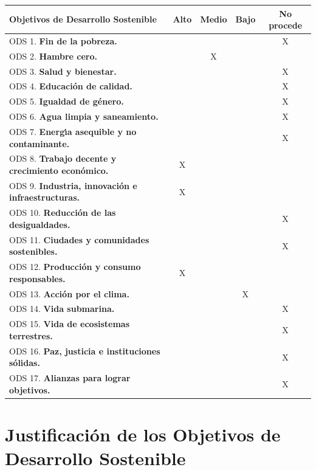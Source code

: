 \documentclass[11pt,spanish,listoffigures,listoftables]{tfgetsinf}
\begin{document}
\begin{tabularx}{\textwidth}{|>{\raggedright\arraybackslash}X|c|c|c|c|}\hline
   \textbf{Objetivos de Desarrollo Sostenible} & \textbf{Alto} & \textbf{Medio} & \textbf{Bajo} & \textbf{No procede} \\ \hline
   ODS 1.  \textbf{Fin de la pobreza.}                            & & & & X \\ \hline
   ODS 2.  \textbf{Hambre cero.}                                  & & X & & \\ \hline
   ODS 3.  \textbf{Salud y bienestar.}                            & & & & X\\ \hline
   ODS 4.  \textbf{Educaci\'on de calidad.}                       & & & & X \\ \hline
   ODS 5.  \textbf{Igualdad de g\'enero.}                         & & & & X \\ \hline
   ODS 6.  \textbf{Agua limpia y saneamiento.}                    & & & & X \\ \hline
   ODS 7.  \textbf{Energ\'{\i}a asequible y no contaminante.}     & & & & X\\ \hline
   ODS 8.  \textbf{Trabajo decente y crecimiento econ\'omico.}    & X & & & \\ \hline
   ODS 9.  \textbf{Industria, innovaci\'on e infraestructuras.}   & X & & & \\ \hline
   ODS 10. \textbf{Reducci\'on de las desigualdades.}             & & & & X\\ \hline
   ODS 11. \textbf{Ciudades y comunidades sostenibles.}           & & & & X\\ \hline
   ODS 12. \textbf{Producci\'on y consumo responsables.}          & X & & & \\ \hline
   ODS 13. \textbf{Acci\'on por el clima.}                        & & & X & \\ \hline
   ODS 14. \textbf{Vida submarina.}                               & & & & X \\ \hline
   ODS 15. \textbf{Vida de ecosistemas terrestres.}               & & & & X\\ \hline
   ODS 16. \textbf{Paz, justicia e instituciones s\'olidas.}      & & & & X\\ \hline
   ODS 17. \textbf{Alianzas para lograr objetivos.}               & & & & X\\ \hline
   \end{tabularx}


   \section*{Justificación de los Objetivos de Desarrollo Sostenible} \label{sec:justificacion_ods}
\end{document}
